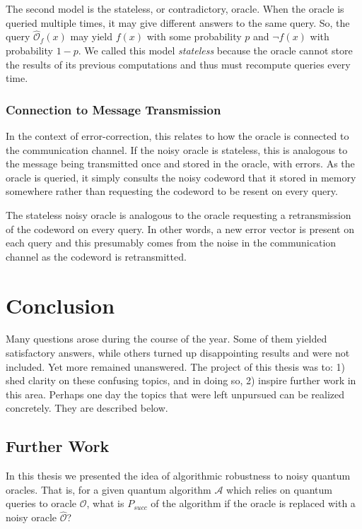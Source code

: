 \documentclass[12pt,twoside]{reedthesis}
\theoremstyle{definition}
\begin{document}
The second model is the stateless, or contradictory, oracle. When the oracle is queried multiple times, it may give different answers to the same query. So, the query $\widehat{\mathcal{O}}_f(x)$ may yield $f(x)$ with some probability $p$ and $\lnot f(x)$ with probability $1-p$. We called this model \textit{stateless} because the oracle cannot store the results of its previous computations and thus must recompute queries every time.

\subsection{Connection to Message Transmission}

In the context of error-correction, this relates to how the oracle is connected to the communication channel. If the noisy oracle is stateless, this is analogous to the message being transmitted once and stored in the oracle, with errors. As the oracle is queried, it simply consults the noisy codeword that it stored in memory somewhere rather than requesting the codeword to be resent on every query. 

The stateless noisy oracle is analogous to the oracle requesting a retransmission of the codeword on every query. In other words, a new error vector is present on each query and this presumably comes from the noise in the communication channel as the codeword is retransmitted.




\chapter*{Conclusion}
	\setcounter{chapter}{8}
	\setcounter{section}{0}
	
Many questions arose during the course of the year. Some of them yielded satisfactory answers, while others turned up disappointing results and were not included. Yet more remained unanswered. The project of this thesis was to: 1) shed clarity on these confusing topics, and in doing so, 2) inspire further work in this area. Perhaps one day the topics that were left unpursued can be realized concretely. They are described below.

\section{Further Work}
In this thesis we presented the idea of algorithmic robustness to noisy quantum oracles. That is, for a given quantum algorithm $\mathcal{A}$ which relies on quantum queries to oracle $\mathcal{O}$, what is $P_{succ}$ of the algorithm if the oracle is replaced with a noisy oracle $\widehat{\mathcal{O}}$?
\end{document}
